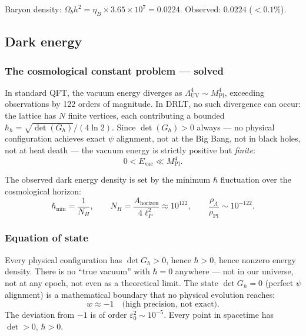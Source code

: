 \documentclass[12pt]{article}
\theoremstyle{remark}
\theoremstyle{definition}
\begin{document}
Baryon density: $\Omega_b h^2 = \eta_B \times 3.65 \times 10^7 = 0.0224$. Observed: $0.0224$ ($< 0.1\%$).

\subsection{Dark energy}

\subsubsection{The cosmological constant problem --- solved}

In standard QFT, the vacuum energy diverges as $\Lambda^4_\text{UV} \sim M_\text{Pl}^4$, exceeding observations by 122 orders of magnitude. In DRLT, no such divergence can occur: the lattice has $N$ finite vertices, each contributing a bounded $\hbar_h = \sqrt{\det(G_h)}/(4\ln 2)$. Since $\det(G_h) > 0$ always --- no physical configuration achieves exact $\psi$ alignment, not at the Big Bang, not in black holes, not at heat death --- the vacuum energy is strictly positive but \emph{finite}:
\begin{equation}
0 < E_\text{vac} \ll M_\text{Pl}^4.
\end{equation}

The observed dark energy density is set by the minimum $\hbar$ fluctuation over the cosmological horizon:
\begin{equation}
\hbar_\text{min} = \frac{1}{N_H}, \qquad N_H = \frac{A_\text{horizon}}{4\ell_P^2} \approx 10^{122}, \qquad \frac{\rho_\Lambda}{\rho_\text{Pl}} \sim 10^{-122}.
\end{equation}

\subsubsection{Equation of state}

Every physical configuration has $\det G_h > 0$, hence $\hbar > 0$, hence nonzero energy density. There is no ``true vacuum'' with $\hbar = 0$ anywhere --- not in our universe, not at any epoch, not even as a theoretical limit. The state $\det G_h = 0$ (perfect $\psi$ alignment) is a mathematical boundary that no physical evolution reaches:
\begin{equation}
\boxed{w \approx -1 \quad\text{(high precision, not exact)}.}
\end{equation}
The deviation from $-1$ is of order $\varepsilon_0^2 \sim 10^{-5}$. Every point in spacetime has $\det > 0$, $\hbar > 0$.
\end{document}
